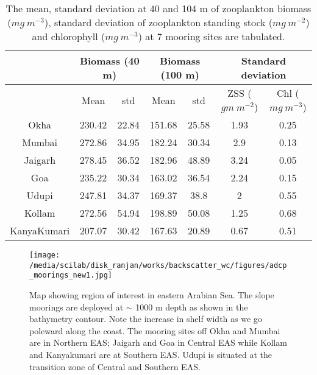 \documentclass{article}
\begin{document}
\newpage
\begin{table}[t]
	
	{\footnotesize
		\captionsetup{justification=justified,font=footnotesize,skip=0.05\baselineskip,width*=\columnwidth} %
		\caption{\newline The mean, standard deviation at 40 and 104 m of zooplankton biomass ($mg \ m^{-3}$), standard deviation of zooplankton standing stock ($mg \ m^{-2}$) and chlorophyll ($mg\ m^{-3}$) at 7 mooring sites are tabulated.}
	\begin{adjustwidth}{0in}{0in} 
\begin{tabular}{ccccccc}
	& \multicolumn{2}{c}{Biomass (40 m)} & \multicolumn{2}{c}{Biomass (100 m)} & \multicolumn{2}{c}{Standard deviation} \\ \hline
	& Mean            & std            & Mean             & std            & ZSS ($gm\ m^{-2}$)        & Chl ($mg \ m^{-3}$)       \\ \hline
	Okha        & 230.42          & 22.84          & 151.68           & 25.58          & 1.93               & 0.25              \\
	Mumbai      & 272.86          & 34.95          & 182.24           & 30.34          & 2.9                & 0.13              \\
	Jaigarh     & 278.45          & 36.52          & 182.96           & 48.89          & 3.24               & 0.05              \\
	Goa         & 235.22          & 30.34          & 163.02           & 36.54          & 2.24               & 0.15              \\
	Udupi       & 247.81          & 34.37          & 169.37           & 38.8           & 2                  & 0.55              \\
	Kollam      & 272.56          & 54.94          & 198.89           & 50.08          & 1.25               & 0.68              \\
	KanyaKumari & 207.07          & 30.42          & 167.63           & 20.89          & 0.67               & 0.51              \\ \hline
\end{tabular}
	\end{adjustwidth}
    \label{tab:table3}
    }
\end{table}

\newpage
\begin{figure}[htbp]
	\centering
	\texttt{[image: /media/scilab/disk\_ranjan/works/backscatter\_wc/figures/adcp\_moorings\_new1.jpg]} 
	\captionsetup{justification=justified,font=footnotesize,skip=0.05\baselineskip,width=0.8\textwidth}
	\caption{Map showing region of interest in eastern Arabian Sea. The slope moorings are
		deployed at $\sim$ 1000 m depth as shown in the bathymetry contour. Note the increase in shelf width as we go poleward along the coast. The mooring sites off Okha and Mumbai are in Northern EAS; Jaigarh and Goa in Central EAS while Kollam and Kanyakumari are at Southern EAS. Udupi is situated at the transition zone of Central and Southern EAS.}
	\label{fig:map}
\end{figure}
\end{document}
